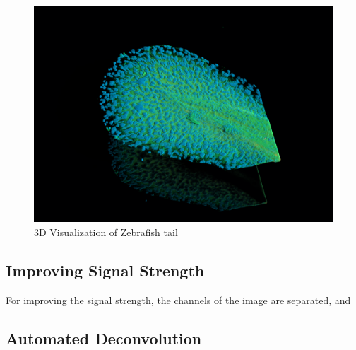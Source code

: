 \documentclass{article}
\begin{document}
\begin{figure}[h!]
    \centering
    \includegraphics[width=0.75\linewidth]{Report/Images/6.4-9/image_3.png}
    \caption{3D Visualization of Zebrafish tail}
    \label{fig:zebrafish_tail}
\end{figure}
\subsection*{Improving Signal Strength}
For improving the signal strength, the channels of the image are separated, and 
\clearpage
\subsection*{Automated Deconvolution}
\end{document}
